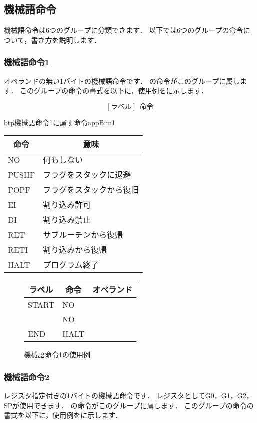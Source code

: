 \subsection{機械語命令}
機械語命令は6つのグループに分類できます．
以下では6つのグループの命令について，書き方を説明します．

\subsubsection{機械語命令1}
オペランドの無い1バイトの機械語命令です．
の命令がこのグループに属します．
このグループの命令の書式を以下に，使用例をに示します．

{\small\[ %
[ラベル]~~命令 \]}

\begin{mytable}{btp}{機械語命令1に属す命令}{appB:m1}
{\small\begin{tabular}{l|l}
\hline\hline
\multicolumn{1}{c|}{命令} & \multicolumn{1}{c}{意味} \\\hline
NO & 何もしない \\
PUSHF & フラグをスタックに退避 \\
POPF & フラグをスタックから復旧 \\
EI & 割り込み許可 \\
DI & 割り込み禁止 \\
RET & サブルーチンから復帰 \\
RETI & 割り込みから復帰 \\
HALT & プログラム終了
\end{tabular}}
\end{mytable}

\begin{figure}[btp]
\begin{center}
{\tt\small\begin{tabular}{|l|l|l|}
\hline
\multicolumn{1}{|c|}{ラベル} & 
        \multicolumn{1}{c|}{命令} & \multicolumn{1}{c|}{オペランド} \\\hline
START & NO   &  \\
      & NO   &  \\
END   & HALT &  \\\hline
\end{tabular}}
\caption{機械語命令1の使用例}
\label{fig:appB:m1ex}
\end{center}
\end{figure}

\subsubsection{機械語命令2}
レジスタ指定付きの1バイトの機械語命令です．
レジスタとしてG0，G1，G2，SPが使用できます．
の命令がこのグループに属します．
このグループの命令の書式を以下に，使用例をに示します．


